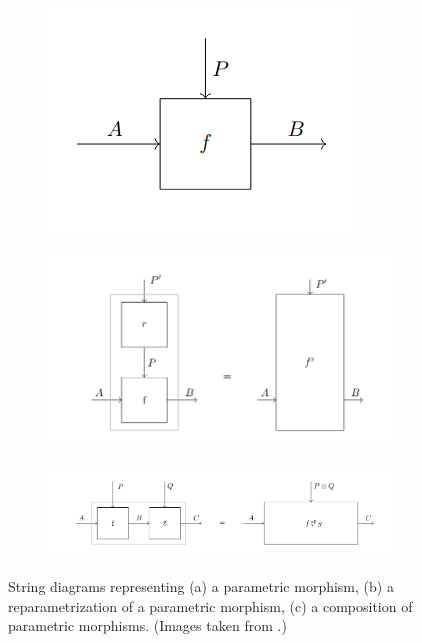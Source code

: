 \documentclass[11pt,a4paper,openright,twoside]{report}
\theoremstyle{plain}
\theoremstyle{definition}
\begin{document}
\begin{figure}[h]
  \begin{center}
    \begin{subfigure}{0.3\textwidth}
      \includegraphics[width=\textwidth]{figures/para.png}
      \caption{}
    \end{subfigure}
    \begin{subfigure}{0.5\textwidth}
      \includegraphics[width=\textwidth]{figures/para_reparametrization.png}
      \caption{}
    \end{subfigure}
    \begin{subfigure}{0.7\textwidth}
      \includegraphics[width=\textwidth]{figures/para_composition.png}
      \caption{}
    \end{subfigure}                 
    \caption[Parametric morphisms]{String diagrams representing (a) a parametric morphism, (b) a reparametrization of a parametric morphism, (c) a composition of parametric morphisms. (Images taken from \cite{gavranovic2024fundamental}.)}\label{fig: paramorphisms}
  \end{center}
\end{figure}
\end{document}
